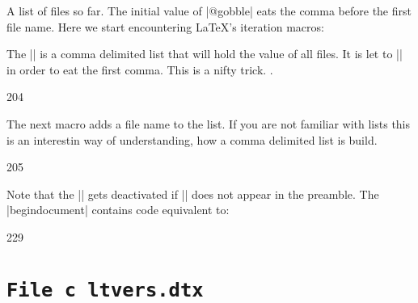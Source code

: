 \begin{multicols}{2}
  A list of files so far. The initial value of |@gobble| eats the comma before the first file name. Here we start encountering \LaTeX's iteration macros:

The |\@filelist| is a comma delimited list that will hold the value of all files. It is let to |\@gobble| in order to eat the first comma. This is a nifty trick. .

\begin{Code}
204 \let\@filelist\@gobble
\end{Code}

The next macro adds a file name to the list. If you are not familiar with lists this is an interestin way of understanding, how a comma delimited list is build.

\begin{Code}
205 %
\end{Code}

Note that the |\@filelist| gets deactivated if |\listfiles| does not appear in the preamble. The |begin{document}|
contains code equivalent to:

\begin{Code}
\AtBeginDocument{%
\ifx\@listfiles\@undefined
\let\@filelist\relax
\let\@addtofilelist\@gobble
\fi}
229 \@onlypreamble{} \let\@dofilelist\relax
\end{Code} 


\end{multicols}

\section{\texttt{File c ltvers.dtx}}

